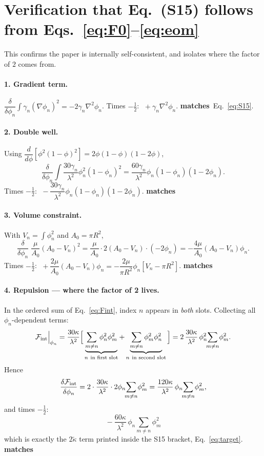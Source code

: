 \documentclass[11pt]{article}
\newcommand{\pn}{\phi_n}
\newcommand{\OK}{{\color{blue}\textbf{matches}}}
\begin{document}
\section{Verification that Eq.~(S15) follows from Eqs.~\eqref{eq:F0}--\eqref{eq:eom}}

This confirms the paper is internally self-consistent, and isolates where the
factor of $2$ comes from.

\paragraph{1. Gradient term.}
$\dfrac{\delta}{\delta\pn}\displaystyle\int\gamma_n(\nabla\pn)^2 = -2\gamma_n\nabla^2\pn$.
Times $-\tfrac12$: $\;+\gamma_n\nabla^2\pn$. \OK\ Eq.~\eqref{eq:S15}.

\paragraph{2. Double well.}
Using $\dfrac{d}{d\phi}\left[\phi^2(1-\phi)^2\right] = 2\phi(1-\phi)(1-2\phi)$,
\[
\frac{\delta}{\delta\pn}\int\frac{30\gamma_n}{\lambda^2}\pn^2(1-\pn)^2
 = \frac{60\gamma_n}{\lambda^2}\pn(1-\pn)(1-2\pn).
\]
Times $-\tfrac12$: $\;-\dfrac{30\gamma_n}{\lambda^2}\pn(1-\pn)(1-2\pn)$. \OK

\paragraph{3. Volume constraint.}
With $V_n=\int\pn^2$ and $A_0=\pi R^2$,
\[
\frac{\delta}{\delta\pn}\;\frac{\mu}{A_0}(A_0-V_n)^2
 = \frac{\mu}{A_0}\cdot 2(A_0-V_n)\cdot(-2\pn)
 = -\frac{4\mu}{A_0}(A_0-V_n)\pn .
\]
Times $-\tfrac12$: $\;+\dfrac{2\mu}{A_0}(A_0-V_n)\pn = -\dfrac{2\mu}{\pi R^2}\pn\!\left[V_n-\pi R^2\right]$. \OK

\paragraph{4. Repulsion --- where the factor of 2 lives.}
In the ordered sum of Eq.~\eqref{eq:Fint}, index $n$ appears in \emph{both}
slots. Collecting all $\pn$-dependent terms:
\[
\mathcal{F}_{\rm int}\Big|_{\pn}
 = \frac{30\kappa}{\lambda^2}\Big[
     \underbrace{\sum_{m\neq n}\pn^2\phi_m^2}_{n\ \text{in first slot}}
   + \underbrace{\sum_{m\neq n}\phi_m^2\pn^2}_{n\ \text{in second slot}}
   \Big]
 = 2\,\frac{30\kappa}{\lambda^2}\,\pn^2\!\!\sum_{m\neq n}\!\phi_m^2 .
\]
Hence
\[
\frac{\delta\mathcal{F}_{\rm int}}{\delta\pn}
 = 2\cdot\frac{30\kappa}{\lambda^2}\cdot 2\pn\!\!\sum_{m\neq n}\!\phi_m^2
 = \frac{120\kappa}{\lambda^2}\,\pn\!\!\sum_{m\neq n}\!\phi_m^2 ,
\]
and times $-\tfrac12$:
\begin{equation}
\boxed{\;-\frac{60\kappa}{\lambda^2}\,\pn\!\!\sum_{m\neq n}\!\phi_m^2\;}
\end{equation}
which is exactly the $2\tilde\kappa$ term printed inside the S15 bracket,
Eq.~\eqref{eq:target}. \OK
\end{document}
